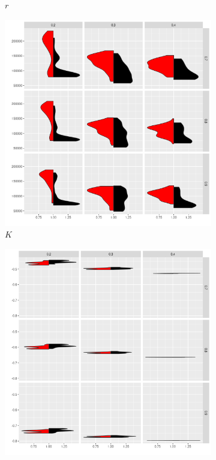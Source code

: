 \begin{figure}[!ht]
\begin{subfigure}{0.32\textwidth}
		\caption{$r$}
		\label{fig:grid-r}
	\end{subfigure}	\begin{subfigure}{0.32\textwidth}  
		\centering 
		\includegraphics[width=\textwidth]{figures/v-k-1.png}
		\caption{$K$}
		\label{fig:grid-k}
	\end{subfigure}	\begin{subfigure}{0.32\textwidth}  
		\centering 
		\includegraphics[width=\textwidth]{figures/v-p-1.png}

\end{subfigure}
\end{figure}

